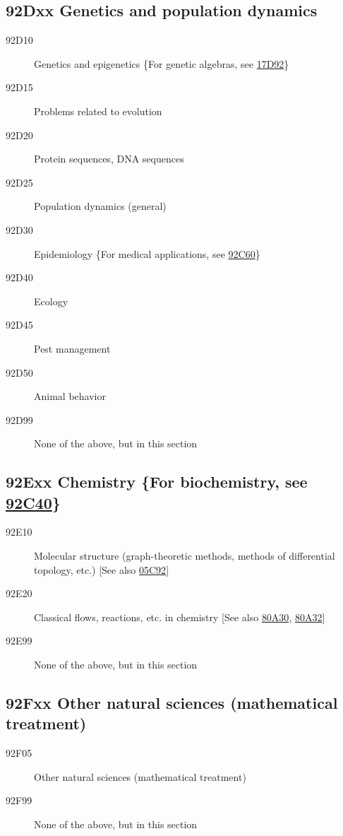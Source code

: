 \documentclass[letterpaper]{article}
\begin{document}
\subsection*{92Dxx  Genetics and population dynamics }\label{92Dxx}
\begin{description}  
\item [92D10]\label{92D10} Genetics and epigenetics \{For genetic algebras, see \hyperref[17D92]{17D92}\}
\item [92D15]\label{92D15} Problems related to evolution
\item [92D20]\label{92D20} Protein sequences, DNA sequences
\item [92D25]\label{92D25} Population dynamics (general)
\item [92D30]\label{92D30} Epidemiology \{For medical applications, see \hyperref[92C60]{92C60}\}
\item [92D40]\label{92D40} Ecology
\item [92D45]\label{92D45} Pest management
\item [92D50]\label{92D50} Animal behavior
\item [92D99]\label{92D99} None of the above, but in this section
\end{description}
\subsection*{92Exx  Chemistry \{For biochemistry, see \hyperref[92C40]{92C40}\} }\label{92Exx}
\begin{description}  
\item [92E10]\label{92E10} Molecular structure (graph-theoretic methods, methods of differential topology, etc.) [See also \hyperref[05C92]{05C92}]
\item [92E20]\label{92E20} Classical flows, reactions, etc. in chemistry [See also \hyperref[80A30]{80A30}, \hyperref[80A32]{80A32}]
\item [92E99]\label{92E99} None of the above, but in this section
\end{description}
\subsection*{92Fxx  Other natural sciences (mathematical treatment) }\label{92Fxx}
\begin{description}  
\item [92F05]\label{92F05} Other natural sciences (mathematical treatment)
\item [92F99]\label{92F99} None of the above, but in this section
\end{description}
\end{document}
